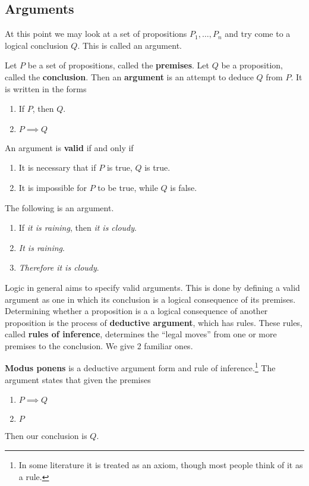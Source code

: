 \documentclass{article}
\begin{document}
  \subsection{Arguments}

    At this point we may look at a set of propositions $P_1, \ldots, P_n$ and try come to a logical conclusion $Q$. This is called an argument. 

    \begin{definition}[Argument]
      Let $P$ be a set of propositions, called the \textbf{premises}. Let $Q$ be a proposition, called the \textbf{conclusion}. Then an \textbf{argument} is an attempt to deduce $Q$ from $P$. It is written in the forms 
      \begin{enumerate}
        \item If $P$, then $Q$.  
        \item $P \implies Q$
      \end{enumerate}
      An argument is \textbf{valid} if and only if  
      \begin{enumerate}
        \item It is necessary that if $P$ is true, $Q$ is true. 
        \item It is impossible for $P$ to be true, while $Q$ is false. 
      \end{enumerate}
    \end{definition}

    \begin{example}
      The following is an argument. 
      \begin{enumerate}
        \item If \textit{it is raining}, then \textit{it is cloudy}. 
        \item \textit{It is raining}. 
        \item \textit{Therefore it is cloudy}.
      \end{enumerate}
    \end{example} 

    Logic in general aims to specify valid arguments. This is done by defining a valid argument as one in which its conclusion is a logical consequence of its premises. Determining whether a proposition is a a logical consequence of another proposition is the process of \textbf{deductive argument}, which has rules. These rules, called \textbf{rules of inference}, determines the ``legal moves'' from one or more premises to the conclusion. We give 2 familiar ones. 

    \begin{definition}
      \textbf{Modus ponens} is a deductive argument form and rule of inference.\footnote{In some literature it is treated as an axiom, though most people think of it as a rule.} The argument states that given the premises
      \begin{enumerate}
        \item $P \implies Q$ 
        \item $P$
      \end{enumerate}
      Then our conclusion is $Q$. 
    \end{definition} 
\end{document}
